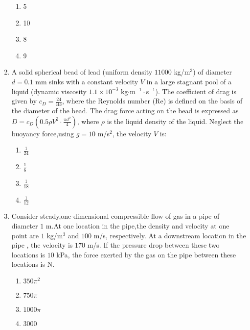 \documentclass[journal,12pt,onecolumn]{IEEEtran}
\theoremstyle{remark}
\begin{document}
\begin{enumerate}
   
    \begin{enumerate}
        \item 5
        \item 10
        \item 8
        \item 9
    \end{enumerate}

    \item A solid spherical bead of lead (uniform density $11000$ kg/m$^3$) of diameter $d = 0.1$ mm sinks with a constant velocity $V$ in a large stagnant pool of a liquid (dynamic viscosity $1.1 \times 10^{-3}$ kg$\cdot$m$^{-1}\cdot$s$^{-1}$). The coefficient of drag is given by $c_D = \frac{24}{\text{Re}}$, where the Reynolds number ($\text{Re}$) is defined on the basis of the diameter of the bead. The drag force acting on the bead is expressed as $D = c_D \left(0.5 \rho V^2 \cdot \frac{\pi d^2}{4}\right)$, where $\rho$ is the liquid density of the liquid. Neglect the buoyancy force,using $g = 10$ m/s$^2$, the velocity $V$ is:
    \begin{enumerate}
        \item $\frac{1}{24}$
        \item $\frac{1}{6}$
        \item $\frac{1}{18}$
        \item $\frac{1}{12}$
    \end{enumerate}
    
    \item Consider steady,one-dimensional compressible flow of gas in a pipe of diameter $1$ m.At one location in the pipe,the density and velocity at one point are $1$ kg/m$^3$ and $100$ m/s, respectively. At a downstream location in the pipe , the velocity is $170$ m/s. If the pressure drop between these two locations is $10$ kPa, the force exerted by the gas on the pipe between these locations is {\underline{\hspace{2cm}}} N.
    \begin{enumerate}
        \item $350\pi^2$
        \item $750\pi$
        \item $1000\pi$
        \item $3000$
    \end{enumerate}


\end{enumerate}
\end{document}
